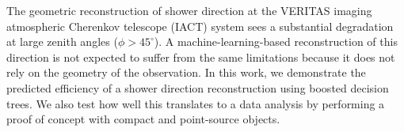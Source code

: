\documentclass[main.tex]{subfiles}
\begin{document}
The geometric reconstruction of shower direction at the VERITAS imaging atmospheric Cherenkov telescope (IACT) system sees a substantial degradation at large zenith angles ($\phi>45^\circ$). A machine-learning-based reconstruction of this direction is not expected to suffer from the same limitations because it does not rely on the geometry of the observation. In this work, we demonstrate the predicted efficiency of a shower direction reconstruction using boosted decision trees. We also test how well this translates to a data analysis by performing a proof of concept with compact and point-source objects.
\end{document}
